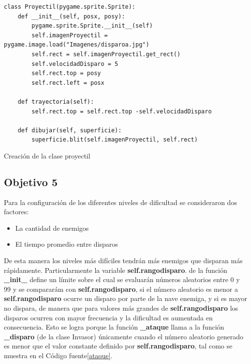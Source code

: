 \documentclass[12pt,letterpaper]{article}
\begin{document}
\begin{listing}[H]
\begin{verbatim}
class Proyectil(pygame.sprite.Sprite):
    def __init__(self, posx, posy):
        pygame.sprite.Sprite.__init__(self)
        self.imagenProyectil = pygame.image.load("Imagenes/disparoa.jpg")
        self.rect = self.imagenProyectil.get_rect()
        self.velocidadDisparo = 5
        self.rect.top = posy
        self.rect.left = posx
        
    def trayectoria(self):
        self.rect.top = self.rect.top -self.velocidadDisparo

    def dibujar(self, superficie):
        superficie.blit(self.imagenProyectil, self.rect)
\end{verbatim}
\caption{Creación de la clase proyectil}
\label{objetivo41}

\end{listing}

\subsection{Objetivo 5} \label{objetivo5}
Para la configuración de los diferentes niveles de dificultad se consideraron dos factores:
\begin{itemize}
    \item La cantidad de enemigos
    \item El tiempo promedio entre disparos
\end{itemize}

De esta manera los niveles más difíciles tendrán más enemigos que disparan más rápidamente. Particularmente la variable \textbf{self.rangodisparo}.   de la función \textbf{\_init\_} define un límite sobre el cual se evaluarán números aleatorios entre 0 y 99 y se compararám con \textbf{self.rangodisparo}, si el número aleatorio es menor a \textbf{self.rangodisparo} ocurre un disparo por parte de la nave enemiga, y si es mayor no dispara, de manera que para valores más grandes de \textbf{self.rangodisparo} los disparos ocurren con mayor frecuencia y la dificultad es aumentada en consecuencia. Esto se logra porque la función \textbf{\_ataque} llama a la función \textbf{\_disparo} (de la clase Invasor) únicamente cuando el número aleatorio generado es menor que el valor constante definido por  \textbf{self.rangodisparo}, tal como se muestra en el Código fuente\ref{ataque}.
\end{document}
